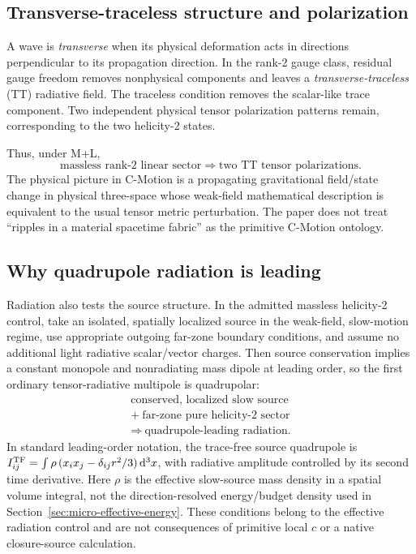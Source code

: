 \documentclass[11pt]{article}
\newcommand{\cmotion}{\mbox{C-Motion}}
\theoremstyle{plain}
\theoremstyle{remark}
\begin{document}
\subsection{Transverse-traceless structure and polarization}

A wave is \emph{transverse} when its physical deformation acts in directions perpendicular
to its propagation direction.  In the rank-2 gauge class, residual gauge freedom removes
nonphysical components and leaves a \emph{transverse-traceless} (TT) radiative field.  The
traceless condition removes the scalar-like trace component.  Two independent physical
tensor polarization patterns remain, corresponding to the two helicity-2 states.

Thus, under M+L,
\begin{equation}
\boxed{
\text{massless rank-2 linear sector}
\Longrightarrow
\text{two TT tensor polarizations}.}
\end{equation}
The physical picture in \cmotion{} is a propagating gravitational field/state change in
physical three-space whose weak-field mathematical description is equivalent to the usual
tensor metric perturbation.  The paper does not treat ``ripples in a material spacetime
fabric'' as the primitive \cmotion{} ontology.

\subsection{Why quadrupole radiation is leading}
\label{sec:quadrupole}

Radiation also tests the source structure.  In the admitted massless helicity-2
control, take an isolated, spatially localized source in the weak-field,
slow-motion regime, use appropriate outgoing far-zone boundary conditions,
and assume no additional light radiative scalar/vector charges.  Then source
conservation implies a constant monopole and nonradiating mass dipole at
leading order, so the first ordinary tensor-radiative multipole is quadrupolar:
\begin{equation}
\boxed{\begin{gathered}
\text{conserved, localized slow source}\\
+\ \text{far-zone pure helicity-2 sector}\\
\Longrightarrow\ \text{quadrupole-leading radiation.}
\end{gathered}}
\label{eq:quadrupole-conditional}
\end{equation}
In standard leading-order notation, the trace-free source quadrupole is
$I_{ij}^{\rm TF}=\int\rho\,(x_i x_j-\delta_{ij}r^2/3)\,\mathrm d^3x$,
with radiative amplitude controlled by its second time derivative.
Here $\rho$ is the effective slow-source mass density in a spatial volume
integral, not the direction-resolved energy/budget density used in
Section~\ref{sec:micro-effective-energy}.
These conditions belong to the effective radiation control and are not
consequences of primitive local $c$ or a native closure-source calculation.
\end{document}
